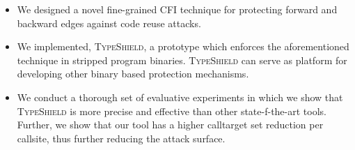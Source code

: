 \label{Contribution}
\begin{itemize}
[leftmargin=.35cm]

 \item 
 We designed a novel fine-grained CFI technique for protecting forward and backward edges 
 against code reuse attacks.
 
 \item 
 We implemented, \textsc{TypeShield}, a prototype which enforces the aforementioned technique
 in stripped program binaries. \textsc{TypeShield} can serve as platform for developing other binary based protection mechanisms.
 
 \item 
 We conduct a thorough set of evaluative experiments in which we show that \textsc{TypeShield} is more precise and effective than 
 other state-f-the-art tools. Further, we show that our tool has a higher calltarget set reduction per callsite, thus further reducing the attack surface.
 
\end{itemize}
